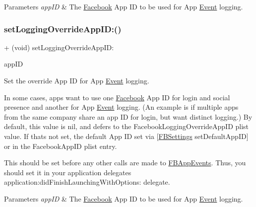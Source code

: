 \begin{DoxyParams}{Parameters}
{\em app\+ID} & The \hyperlink{interfaceFacebook}{Facebook} App ID to be used for App \hyperlink{classEvent}{Event} logging. \\
\hline
\end{DoxyParams}
\mbox{\label{interfaceFBAppEvents_a3f9d06a1e8b3d482efc5c438827fbc6e}} 
\subsubsection{\texorpdfstring{set\+Logging\+Override\+App\+I\+D\+:()}{setLoggingOverrideAppID:()}\hspace{0.1cm}{\footnotesize\ttfamily [3/5]}}
{\footnotesize\ttfamily + (void) set\+Logging\+Override\+App\+I\+D\+: \begin{DoxyParamCaption}\item[{(N\+S\+String $\ast$)}]{app\+ID }\end{DoxyParamCaption}}

Set the \textquotesingle{}override\textquotesingle{} App ID for App \hyperlink{classEvent}{Event} logging.

In some cases, apps want to use one \hyperlink{interfaceFacebook}{Facebook} App ID for login and social presence and another for App \hyperlink{classEvent}{Event} logging. (An example is if multiple apps from the same company share an app ID for login, but want distinct logging.) By default, this value is {\ttfamily nil}, and defers to the {\ttfamily Facebook\+Logging\+Override\+App\+ID} plist value. If that\textquotesingle{}s not set, the default App ID set via \mbox{[}\hyperlink{interfaceFBSettings}{F\+B\+Settings} set\+Default\+App\+ID\mbox{]} or in the {\ttfamily Facebook\+App\+ID} plist entry.

This should be set before any other calls are made to {\ttfamily \hyperlink{interfaceFBAppEvents}{F\+B\+App\+Events}}. Thus, you should set it in your application delegate\textquotesingle{}s {\ttfamily application\+:did\+Finish\+Launching\+With\+Options\+:} delegate.


\begin{DoxyParams}{Parameters}
{\em app\+ID} & The \hyperlink{interfaceFacebook}{Facebook} App ID to be used for App \hyperlink{classEvent}{Event} logging. \\
\hline
\end{DoxyParams}
\mbox{\label{interfaceFBAppEvents_a3f9d06a1e8b3d482efc5c438827fbc6e}} 
